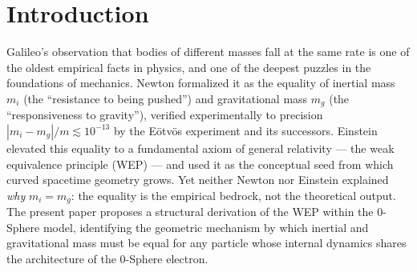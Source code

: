 \documentclass[%
 reprint, amsmath,amssymb, aps, prb, ]{revtex4-2}
\numberwithin{equation}{section}
\newcommand{\iphase}{\theta}
\newcommand{\lambdaC}{\lambda_{\mathrm{C}}}
\newcommand{\anom}{a_{\mathrm{e}}}
\newcommand{\ehat}[1]{\hat{e}_{#1}}
\begin{document}
\begin{abstract}
The $\lambdaC$ cancellation theorem rests on three supporting results that the paper also establishes.
First, the derivation applies to a single hydrogen atom without ensemble averaging, consistent with Einstein's realist program: the hidden variables $(\iphase, \hat{e})$ are real and definite, and the gravitational coupling is a property of the individual particle.
Second, the deterministic ZB axis drift arising from the anomalous magnetic moment $\anom \neq 0$ provides the single-particle scanning mechanism by which $\hat{e}$ converges toward alignment with $\hat{g}$, enabling the turning-point asymmetry that drives the gravitational coupling.
Third, the three coordinate directions of the photon-sphere helix carry three physically distinct interaction types: the velocity direction $\ehat{x}$ (longitudinal coupling, gravitational sector), the acceleration direction $\ehat{y}$ (transverse radiation, electromagnetic sector), and the cross-product direction $\ehat{z} = \ehat{x}\times\ehat{y}$ (Thomas precession, spinorial sector).
This paper is a Structural Proposal; the directional decomposition and the full recovery of $F = m_e g$ are recorded as open tasks.
\end{abstract}

\maketitle

\section{Introduction}
\label{sec:intro}

Galileo's observation that bodies of different masses fall at the same rate is one of the oldest empirical facts in physics, and one of the deepest puzzles in the foundations of mechanics.
Newton formalized it as the equality of inertial mass $m_i$ (the ``resistance to being pushed'') and gravitational mass $m_g$ (the ``responsiveness to gravity''), verified experimentally to precision $|m_i - m_g|/m \lesssim 10^{-13}$ by the E\"{o}tv\"{o}s experiment and its successors.
Einstein elevated this equality to a fundamental axiom of general relativity --- the weak equivalence principle (WEP) --- and used it as the conceptual seed from which curved spacetime geometry grows.
Yet neither Newton nor Einstein explained \emph{why} $m_i = m_g$: the equality is the empirical bedrock, not the theoretical output.
The present paper proposes a structural derivation of the WEP within the 0-Sphere model, identifying the geometric mechanism by which inertial and gravitational mass must be equal for any particle whose internal dynamics shares the architecture of the 0-Sphere electron.
\end{document}
